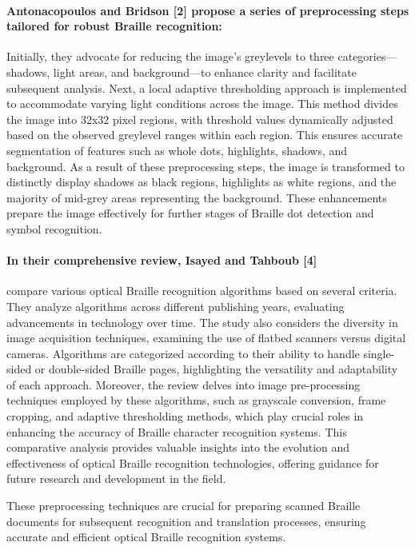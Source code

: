 \paragraph{Antonacopoulos and Bridson [2] propose a series of preprocessing steps tailored for robust Braille recognition:}
Initially, they advocate for reducing the image's greylevels to three categories—shadows, light areas, and background—to enhance clarity and facilitate subsequent analysis. Next, a local adaptive thresholding approach is implemented to accommodate varying light conditions across the image. This method divides the image into 32x32 pixel regions, with threshold values dynamically adjusted based on the observed greylevel ranges within each region. This ensures accurate segmentation of features such as whole dots, highlights, shadows, and background. As a result of these preprocessing steps, the image is transformed to distinctly display shadows as black regions, highlights as white regions, and the majority of mid-grey areas representing the background. These enhancements prepare the image effectively for further stages of Braille dot detection and symbol recognition.\\

\paragraph{In their comprehensive review, Isayed and Tahboub [4]}
 compare various optical Braille recognition algorithms based on several criteria. They analyze algorithms across different publishing years, evaluating advancements in technology over time. The study also considers the diversity in image acquisition techniques, examining the use of flatbed scanners versus digital cameras. Algorithms are categorized according to their ability to handle single-sided or double-sided Braille pages, highlighting the versatility and adaptability of each approach. Moreover, the review delves into image pre-processing techniques employed by these algorithms, such as grayscale conversion, frame cropping, and adaptive thresholding methods, which play crucial roles in enhancing the accuracy of Braille character recognition systems. This comparative analysis provides valuable insights into the evolution and effectiveness of optical Braille recognition technologies, offering guidance for future research and development in the field.


These preprocessing techniques are crucial for preparing scanned Braille documents for subsequent recognition and translation processes, ensuring accurate and efficient optical Braille recognition systems. 
\\
